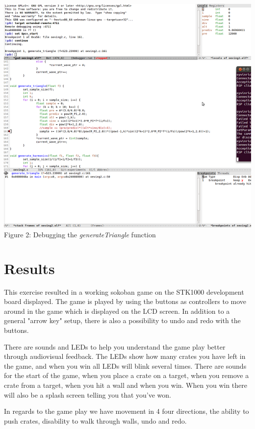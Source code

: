 \documentclass[a4paper,11pt]{article}
\begin{document}
\begin{center}

\includegraphics{images/debugsmall.png}
Figure 2: Debugging the \emph{generateTriangle} function
\end{center}

\section{Results}
This exercise resulted in a working sokoban game on the STK1000 development board displayed. The game is played by using the buttons as controllers to move around in the game which is displayed on the LCD screen. In addition to a general "arrow key" setup, there is also a possibility to undo and redo with the buttons. 

There are sounds and LEDs to help you understand the game play better through audiovisual feedback. The LEDs show how many crates you have left in the game, and when you win all LEDs will blink several times. There are sounds for the start of the game, when you place a crate on a target, when you remove a crate from a target, when you hit a wall and when you win. When you win there will also be a splash screen telling you that you've won. 

In regards to the game play we have movement in 4 four directions, the ability to push crates, disability to walk through walls, undo and redo. 
\end{document}
